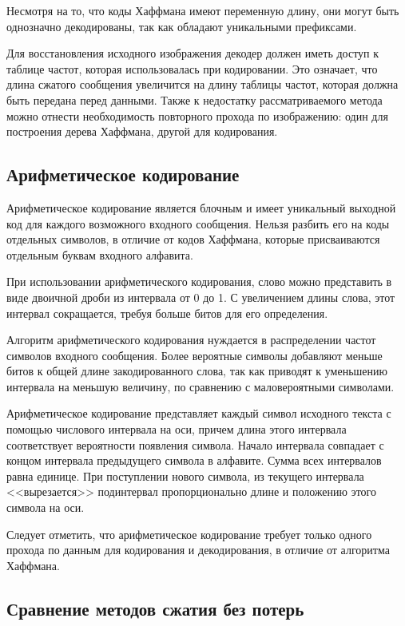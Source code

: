 Несмотря на то, что коды Хаффмана имеют переменную длину, они могут быть однозначно декодированы, так как обладают уникальными префиксами. 

Для восстановления исходного изображения декодер должен иметь доступ к таблице частот, которая использовалась при кодировании. Это означает, что длина сжатого сообщения увеличится на длину таблицы частот, которая должна быть передана перед данными. Также к недостатку рассматриваемого метода можно отнести необходимость повторного прохода по изображению: один для построения дерева Хаффмана, другой для кодирования.

\subsection{Арифметическое кодирование}

Арифметическое кодирование является блочным и имеет уникальный выходной код для каждого возможного входного сообщения. Нельзя разбить его на коды отдельных символов, в отличие от кодов Хаффмана, которые присваиваются отдельным буквам входного алфавита.

При использовании арифметического кодирования, слово можно представить в виде двоичной дроби из интервала от 0 до 1. С увеличением длины слова, этот интервал сокращается, требуя больше битов для его определения. 

Алгоритм арифметического кодирования нуждается в  распределении частот символов входного сообщения. Более вероятные символы добавляют меньше битов к общей длине закодированного слова, так как приводят к уменьшению интервала на меньшую величину, по сравнению с маловероятными символами. 

Арифметическое кодирование представляет каждый символ исходного текста с помощью числового интервала на оси, причем длина этого интервала соответствует вероятности появления символа. Начало интервала совпадает с концом интервала предыдущего символа в алфавите. Сумма всех интервалов равна единице. При поступлении нового символа, из текущего интервала <<вырезается>> подинтервал пропорционально длине и положению этого символа на оси.

Следует отметить, что арифметическое кодирование требует только одного прохода по данным для кодирования и декодирования, в отличие от алгоритма Хаффмана.

\subsection{Сравнение методов сжатия без потерь}

